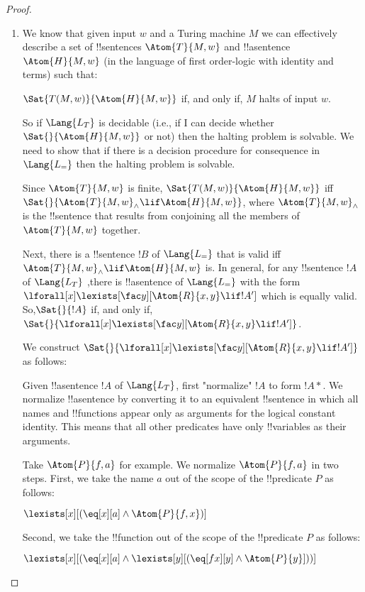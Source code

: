 \documentclass[../../../include/open-logic-section]{subfiles}
\begin{document}

\begin{proof}
\begin{enumerate}
\item We know that given input $w$ and a Turing machine $M$ we can
effectively describe a set of !!{sentence}s $\Atom{T}{M,w}$ and
!!a{sentence} $\Atom{H}{M,w}$ (in the
language of first order-logic with identity and terms) such that:

$\Sat{T(M,w)}{\Atom{H}{M,w}}$ if, and only if, $M$ halts of input $w$.

So if $\Lang{L_T}$ is decidable (i.e., if I can decide whether
$\Sat{}{\Atom{H}{M,w}}$ or not) then the halting problem is
solvable. We need to
show that if there is a decision procedure for consequence in $\Lang{L_=}$
then the halting problem is solvable.

Since $\Atom{T}{M,w}$ is finite, $\Sat{T(M,w)}{ \Atom{H}{M,w} }$
iff $\Sat{}{\Atom{T}{M,w}_\land \lif
\Atom{H}{M,w}}$, where $\Atom{T}{M,w}_\land$ is the !!{sentence} that
results from conjoining all
the members of $\Atom{T}{M,w}$ together.

Next, there is a !!{sentence} $!B$ of $\Lang{L_=}$ that is valid iff
$\Atom{T}{M,w}_\land\lif \Atom{H}{M,w}$ is. In general, for any
!!{sentence} $!A$ of $\Lang{L_T}$ ,there is
!!a{sentence} of $\Lang{L_=}$ with the form
$\lforall[x]\lexists[\fac y][\Atom{R}{x,y}\lif !A']$ which is equally valid.
So,$\Sat{}{!A}$ if, and only if,
$\Sat{}{\lforall[x]\lexists[\fac y][\Atom{R}{x,y}\lif !A']}$.

We construct $\Sat{}{\lforall[x]\lexists[\fac y][\Atom{R}{x,y}\lif !A']}$ as
follows:

Given !!a{sentence} $!A$ of $\Lang{L_T}$, first "normalize" $!A$ to form
$!A*$.
We normalize !!a{sentence} by converting it to an equivalent !!{sentence}
in
which all names and !!{function}s appear only as arguments for the
logical constant identity. This means that all other predicates have
only !!{variable}s as their arguments.

Take $\Atom{P}{f,a}$ for example. We normalize $\Atom{P}{f,a}$ in two
steps. First, we take the name $a$ out of the scope of the !!{predicate}
$P$ as follows:

$\lexists[x][(\eq[x][a] \land \Atom{P}{f,x})]$

Second, we take the !!{function} out of the scope of the
!!{predicate} $P$ as follows:

$\lexists[x][(\eq[x][a] \land \lexists[y][(\eq[fx][y] \land
\Atom{P}{y}]))]$


\end{enumerate}
\end{proof}
\end{document}
